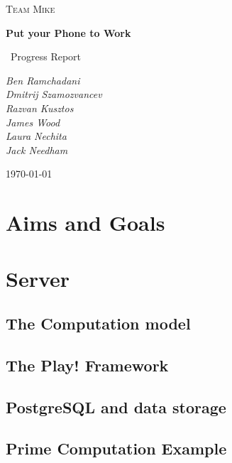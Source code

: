 \documentclass[a4paper,10pt]{article}
\title{}
\author{}
\date{}
\begin{document}
\begin{titlepage}
	\centering
	
	{\scshape\Large Team Mike\par}
	\vspace{4cm}
	{\huge\bfseries Put your Phone to Work\par}
	\vspace{1.5cm}
	{\Large\
	Progress Report
	\par}
	\vspace{2cm}
	{\Large\itshape 
	      Ben Ramchadani\\
	      Dmitrij Szamozvancev\\
	      Razvan Kusztos\\
	      James Wood \\
	      Laura Nechita \\
	      Jack Needham
	      \par}
	\vfill

	{\large \today\par}
\end{titlepage}
\maketitle
\tableofcontents
\newpage
\section{Aims and Goals}
\section{Server}

\subsection{The Computation model}

\subsection{The Play! Framework}

\subsection{PostgreSQL and data storage}

\subsection{Prime Computation Example}
\end{document}
